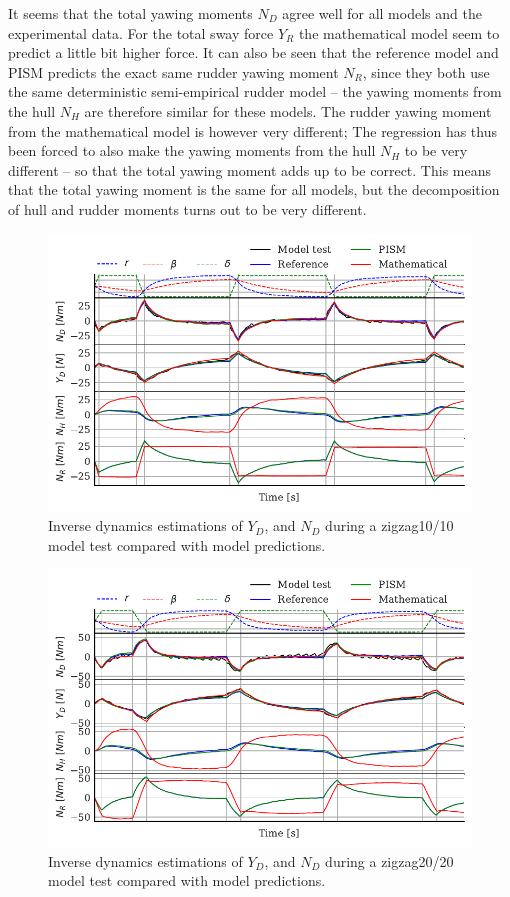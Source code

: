It seems that the total yawing moments $N_D$ agree well for all models and the experimental data. For the total sway force $Y_R$ the mathematical model seem to predict a little bit higher force.  
It can also be seen that the reference model and PISM predicts the exact same rudder yawing moment $N_R$, since they both use the same deterministic semi-empirical rudder model -- the yawing moments from the hull $N_H$ are therefore similar for these models. The rudder yawing moment from the mathematical model is however very different; The regression has thus been forced to also make the yawing moments from the hull $N_H$ to be very different -- so that the total yawing moment adds up to be correct. This means that the total yawing moment is the same for all models, but the decomposition of hull and rudder moments turns out to be very different.
\begin{figure}[h]
    \centering
    \includegraphics[height=0.40\textheight]{figures/results.ID_zigzag10.pdf}
    \caption{Inverse dynamics estimations of $Y_D$, and $N_D$ during a zigzag10/10 model test compared with model predictions.}
    \label{fig:ID_zigzag10}
\end{figure}
\begin{figure}[h]
    \centering
    \includegraphics[height=0.40\textheight]{figures/results.ID_zigzag20.pdf}
    \caption{Inverse dynamics estimations of $Y_D$, and $N_D$ during a zigzag20/20 model test compared with model predictions.}
    \label{fig:ID_zigzag20}
\end{figure}
